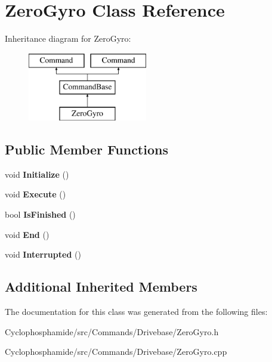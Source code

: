 \hypertarget{class_zero_gyro}{}\section{Zero\+Gyro Class Reference}
\label{class_zero_gyro}
Inheritance diagram for Zero\+Gyro\+:\begin{figure}[H]
\begin{center}
\leavevmode
\includegraphics[height=3.000000cm]{class_zero_gyro}
\end{center}
\end{figure}
\subsection*{Public Member Functions}
\begin{DoxyCompactItemize}
\item 
\hypertarget{class_zero_gyro_a178a4ffa89e9111068606ac3a57200c6}{}void {\bfseries Initialize} ()\label{class_zero_gyro_a178a4ffa89e9111068606ac3a57200c6}

\item 
\hypertarget{class_zero_gyro_a4f4ea89be6460502d8286423c8cb81cb}{}void {\bfseries Execute} ()\label{class_zero_gyro_a4f4ea89be6460502d8286423c8cb81cb}

\item 
\hypertarget{class_zero_gyro_a427bf7a0e36b00bca9dfcf21fcae6093}{}bool {\bfseries Is\+Finished} ()\label{class_zero_gyro_a427bf7a0e36b00bca9dfcf21fcae6093}

\item 
\hypertarget{class_zero_gyro_ac6c3def0b314afff6d7e48f7811c1bf9}{}void {\bfseries End} ()\label{class_zero_gyro_ac6c3def0b314afff6d7e48f7811c1bf9}

\item 
\hypertarget{class_zero_gyro_af87cb0199efadb4568113aac1b1ba137}{}void {\bfseries Interrupted} ()\label{class_zero_gyro_af87cb0199efadb4568113aac1b1ba137}

\end{DoxyCompactItemize}
\subsection*{Additional Inherited Members}


The documentation for this class was generated from the following files\+:\begin{DoxyCompactItemize}
\item 
Cyclophosphamide/src/\+Commands/\+Drivebase/Zero\+Gyro.\+h\item 
Cyclophosphamide/src/\+Commands/\+Drivebase/Zero\+Gyro.\+cpp\end{DoxyCompactItemize}
